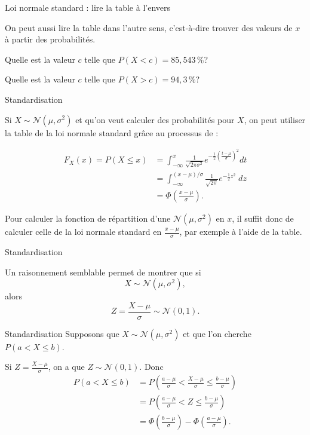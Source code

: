 \documentclass{BeamerTemplate}
\newcommand{\cibleReponse}{}
\newcommand{\lienreponse}[1]{\gdef\cibleReponse{#1}}
\begin{document}
\begin{frame}[t,label=exenvers]{Loi normale standard : lire la table à l'envers}

On peut aussi lire la table dans l'autre sens, c'est-à-dire trouver des valeurs de $x$ à partir des probabilités.
\vspace{0.1in}

Quelle est la valeur $c$ telle que $P(X < c) = 85{,}543\,\%$?
\vspace{1in}

Quelle est la valeur $c$ telle que $P(X > c) = 94{,}3\,\%$?

\lienreponse{rep-ex2}
\end{frame}


\begin{frame}{Standardisation}

Si $X \sim \mathcal{N}(\mu, \sigma^2)$ et qu'on veut calculer des probabilités pour $X$, on peut utiliser
la table de la loi normale standard grâce au processus de  :

\begin{align*}
F_X(x)= P(X\le x)&=\int_{-\infty}^x \frac{1}{\sqrt{2\pi\sigma^2}}e^{-\frac{1}{2}(\frac{t-\mu}{\sigma})^2}dt\\[6pt]
&=\int_{-\infty}^{(x-\mu)/\sigma}\frac{1}{\sqrt{2\pi}}e^{-\frac{1}{2}z^2}\;dz\\[6pt]
&=\Phi\left(\frac{x-\mu}{\sigma}\right).
\end{align*}

\vspace{0.1in}
{\small Pour calculer la fonction de répartition d'une $\mathcal{N}(\mu, \sigma^2)$ en $x$, il suffit donc
de calculer celle de la loi normale standard en $\frac{x-\mu}{\sigma}$, par exemple à l'aide de la table.}

\end{frame}


\begin{frame}{Standardisation}

Un raisonnement semblable permet de montrer que si $$X\sim \mathcal{N}(\mu,\sigma^2),$$
alors $$Z=\frac{X-\mu}{\sigma} \sim \mathcal{N}(0,1).$$

\vspace{0.4in}

\end{frame}


\begin{frame}[t]{Standardisation}
Supposons que $X\sim \mathcal{N}(\mu,\sigma^2)$ et que l'on cherche
$P(a<X\le b)$.

\vspace{0.1in}
Si $Z=\frac{X-\mu}{\sigma}$, on a que $Z\sim \mathcal{N}(0,1)$. Donc
\begin{align*}
P(a<X\le b)&=P\left(\frac{a-\mu}{\sigma}<\frac{X-\mu}{\sigma}\le
\frac{b-\mu}{\sigma}\right)\\[6pt]
&=P\left(\frac{a-\mu}{\sigma}<Z\le
\frac{b-\mu}{\sigma}\right)\\[6pt]
&=\Phi\left(\frac{b-\mu}{\sigma}\right)-\Phi\left(\frac{a-\mu}{\sigma}\right).
\end{align*}
\end{frame}
\end{document}
